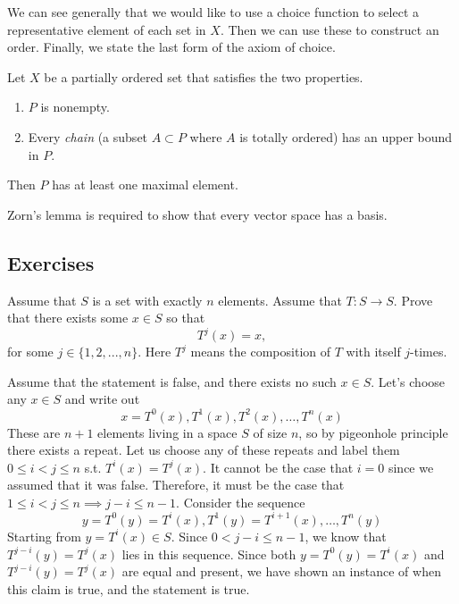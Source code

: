  We can see generally that we would like to use a choice function to select a representative element of each set in $X$. Then we can use these to construct an order. Finally, we state the last form of the axiom of choice. 

  \begin{axiom}
    Let $X$ be a partially ordered set that satisfies the two properties. 
    \begin{enumerate}
      \item $P$ is nonempty. 
      \item Every \textit{chain} (a subset $A \subset P$ where $A$ is totally ordered) has an upper bound in $P$. 
    \end{enumerate}
    Then $P$ has at least one maximal element. 
  \end{axiom}

  Zorn's lemma is required to show that every vector space has a basis. 

\subsection{Exercises}

  \begin{exercise}
    Assume that $S$ is a set with exactly $n$ elements. Assume that $T : S \to S$.
    Prove that there exists some $x \in S$ so that
    \begin{equation}
      T^j(x) = x,
    \end{equation}
    for some $j \in \{1,2,...,n\}$. Here $T^j$ means the composition of $T$ with itself
    $j$-times.
  \end{exercise}
  \begin{solution}
    Assume that the statement is false, and there exists no such $x \in S$. Let's choose any $x \in S$ and write out 
    \begin{equation}
      x = T^0 (x) , T^1 (x), T^2 (x), \ldots, T^n (x)
    \end{equation}
    These are $n+1$ elements living in a space $S$ of size $n$, so by pigeonhole principle there exists a repeat. Let us choose any of these repeats and label them $0 \leq i < j \leq n$ s.t. $T^i (x) = T^j (x)$. It cannot be the case that $i = 0$ since we assumed that it was false. Therefore, it must be the case that $1 \leq i < j \leq n \implies j - i \leq n-1$. Consider the sequence 
    \begin{equation}
      y = T^0 (y) = T^i (x), T^1 (y) = T^{i+1} (x), \ldots, T^n (y)
    \end{equation}
    Starting from $y = T^i (x) \in S$. Since $0 < j - i \leq n - 1$, we know that $T^{j-i} (y) = T^j (x)$ lies in this sequence. Since both $y = T^0 (y) = T^i (x)$ and $T^{j-i} (y) = T^j (x)$ are equal and present, we have shown an instance of when this claim is true, and the statement is true. 
  \end{solution}

